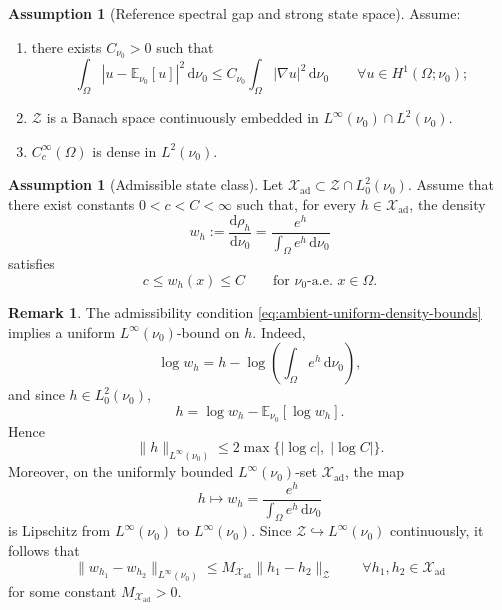 \documentclass{article}
\theoremstyle{definition}
\newtheorem{remark}[theorem]{Remark}
\newtheorem{assumption}[theorem]{Assumption}
\renewcommand{\d}{\mathrm{d}}
\begin{document}
\begin{assumption}[Reference spectral gap and strong state space]
    \label{ass:abstract-forward-reference}
    Assume:
    \begin{enumerate}
        \item there exists \(C_{\nu_0}>0\) such that
              \begin{equation}
                  \label{eq:reference-poincare}
                  \int_\Omega
                  \left|u-\mathbb E_{\nu_0}[u]\right|^2\,\d\nu_0
                  \le
                  C_{\nu_0}
                  \int_\Omega |\nabla u|^2\,\d\nu_0
                  \qquad
                  \forall u\in H^1(\Omega;\nu_0);
              \end{equation}
        \item \(\mathcal Z\) is a Banach space continuously embedded in
              \(L^\infty(\nu_0)\cap L^2(\nu_0)\).
        \item \(C_c^\infty(\Omega)\) is dense in \(L^2(\nu_0)\).
    \end{enumerate}
\end{assumption}

\begin{assumption}[Admissible state class]
    \label{ass:ambient-admissible-class}
    Let \(\mathcal X_{\mathrm{ad}}\subset \mathcal Z\cap L^2_0(\nu_0)\). Assume that there exist
    constants \(0<c<C<\infty\) such that, for every \(h\in\mathcal X_{\mathrm{ad}}\), the density
    \[
        w_h:=\frac{\d\rho_h}{\d\nu_0}
        =
        \frac{e^h}{\int_\Omega e^h\,\d\nu_0}
    \]
    satisfies
    \begin{equation}
        \label{eq:ambient-uniform-density-bounds}
        c\le w_h(x)\le C
        \qquad\text{for }\nu_0\text{-a.e. }x\in\Omega.
    \end{equation}
\end{assumption}

\begin{remark}
    \label{rem:ambient-admissible-implies-linfty}
    The admissibility condition \eqref{eq:ambient-uniform-density-bounds} implies a uniform
    \(L^\infty(\nu_0)\)-bound on \(h\). Indeed,
    \[
        \log w_h
        =
        h-\log\!\left(\int_\Omega e^h\,\d\nu_0\right),
    \]
    and since \(h\in L^2_0(\nu_0)\),
    \[
        h=\log w_h-\mathbb E_{\nu_0}[\log w_h].
    \]
    Hence
    \[
        \|h\|_{L^\infty(\nu_0)}
        \le
        2\max\{|\log c|,\;|\log C|\}.
    \]
    Moreover, on the uniformly bounded \(L^\infty(\nu_0)\)-set \(\mathcal X_{\mathrm{ad}}\), the map
    \[
        h\longmapsto w_h=\frac{e^h}{\int_\Omega e^h\,\d\nu_0}
    \]
    is Lipschitz from \(L^\infty(\nu_0)\) to \(L^\infty(\nu_0)\). Since
    \(\mathcal Z\hookrightarrow L^\infty(\nu_0)\) continuously, it follows that
    \begin{equation}
        \label{eq:ambient-weight-lipschitz}
        \|w_{h_1}-w_{h_2}\|_{L^\infty(\nu_0)}
        \le
        M_{\mathcal X_{\mathrm{ad}}}\|h_1-h_2\|_{\mathcal Z}
        \qquad
        \forall h_1,h_2\in\mathcal X_{\mathrm{ad}}
    \end{equation}
    for some constant \(M_{\mathcal X_{\mathrm{ad}}}>0\).
\end{remark}
\end{document}
